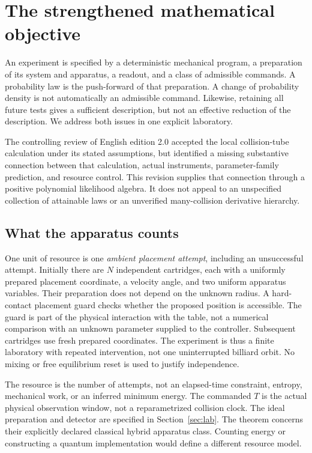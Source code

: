 \section{The strengthened mathematical objective}\label{sec:scope}
An experiment is specified by a deterministic mechanical program, a
preparation of its system and apparatus, a readout, and a class of admissible
commands. A probability law is the push-forward of that preparation. A
change of probability density is not automatically an admissible command.
Likewise, retaining all future tests gives a sufficient description, but not
an effective reduction of the description. We address both issues in one
explicit laboratory.

The controlling review of English edition 2.0 accepted the local
collision-tube calculation under its stated assumptions, but identified a
missing substantive connection between that calculation, actual instruments,
parameter-family prediction, and resource control. This revision supplies
that connection through a positive polynomial likelihood algebra. It does
not appeal to an unspecified collection of attainable laws or an unverified
many-collision derivative hierarchy.

\subsection{What the apparatus counts}
One unit of resource is one \emph{ambient placement attempt}, including an
unsuccessful attempt. Initially there are $N$ independent cartridges, each
with a uniformly prepared placement coordinate, a velocity angle, and two
uniform apparatus variables. Their preparation does not depend on the
unknown radius. A hard-contact placement guard checks whether the proposed
position is accessible. The guard is part of the physical interaction with
the table, not a numerical comparison with an unknown parameter supplied to
the controller. Subsequent cartridges use fresh prepared coordinates. The
experiment is thus a finite laboratory with repeated intervention, not one
uninterrupted billiard orbit. No mixing or free equilibrium reset is used to
justify independence.

The resource is the number of attempts, not an elapsed-time constraint,
entropy, mechanical work, or an inferred minimum energy. The commanded $T$
is the actual physical observation window, not a reparametrized collision clock.
The ideal preparation and detector are specified in Section~\ref{sec:lab}.
The theorem concerns their explicitly declared classical hybrid apparatus
class. Counting energy or constructing a quantum implementation would define
a different resource model.


